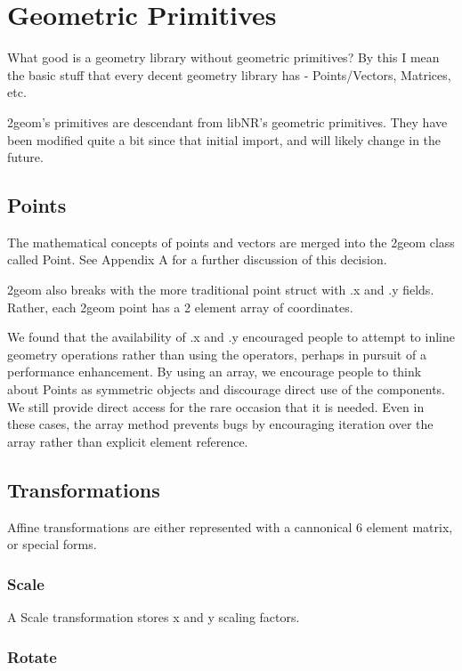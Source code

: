 \documentclass{book}
\newcommand{\code}[1]{\textsf{#1}}
\begin{document}
\chapter{Geometric Primitives}

What good is a geometry library without geometric primitives?  By this
I mean the basic stuff that every decent geometry library has -
Points/Vectors, Matrices, etc.

2geom's primitives are descendant from libNR's geometric primitives.
They have been modified quite a bit since that initial import, and
will likely change in the future.

\section{Points}

The mathematical concepts of points and vectors are merged into the
2geom class called \code{Point}.  See Appendix A for a further
discussion of this decision.

2geom also breaks with the more traditional point \code{struct} with
\code{.x} and \code{.y} fields.  Rather, each 2geom point has a 2
element array of coordinates.

We found that the availability of \code{.x} and \code{.y} encouraged
people to attempt to inline geometry operations rather than using the
operators, perhaps in pursuit of a performance enhancement.  By using
an array, we encourage people to think about \code{Point}s as
symmetric objects and discourage direct use of the components.  We
still provide direct access for the rare occasion that it is needed.
Even in these cases, the array method prevents bugs by encouraging
iteration over the array rather than explicit element reference.

\section{Transformations}

Affine transformations are either represented with a cannonical 6
element matrix, or special forms.

\subsection{Scale}

A \code{Scale} transformation stores x and y scaling factors.

\subsection{Rotate}
\end{document}
